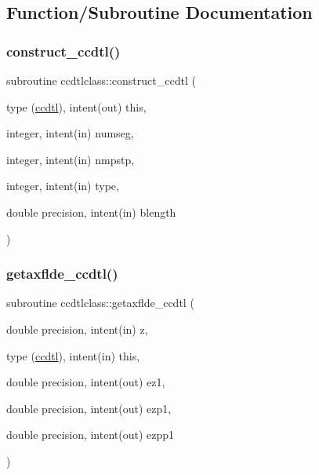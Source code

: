 \subsection{Function/\+Subroutine Documentation}
\mbox{\label{namespaceccdtlclass_aaa94d8179c6d59c2d3e81b64e8237962}} 
\subsubsection{\texorpdfstring{construct\_ccdtl()}{construct\_ccdtl()}}
{\footnotesize\ttfamily subroutine ccdtlclass\+::construct\+\_\+ccdtl (\begin{DoxyParamCaption}\item[{type (\mbox{\hyperlink{namespaceccdtlclass_structccdtlclass_1_1ccdtl}{ccdtl}}), intent(out)}]{this,  }\item[{integer, intent(in)}]{numseg,  }\item[{integer, intent(in)}]{nmpstp,  }\item[{integer, intent(in)}]{type,  }\item[{double precision, intent(in)}]{blength }\end{DoxyParamCaption})}

\mbox{\label{namespaceccdtlclass_adb7b1c30d3fcb087a5064911ccd4fd1d}} 
\subsubsection{\texorpdfstring{getaxflde\_ccdtl()}{getaxflde\_ccdtl()}}
{\footnotesize\ttfamily subroutine ccdtlclass\+::getaxflde\+\_\+ccdtl (\begin{DoxyParamCaption}\item[{double precision, intent(in)}]{z,  }\item[{type (\mbox{\hyperlink{namespaceccdtlclass_structccdtlclass_1_1ccdtl}{ccdtl}}), intent(in)}]{this,  }\item[{double precision, intent(out)}]{ez1,  }\item[{double precision, intent(out)}]{ezp1,  }\item[{double precision, intent(out)}]{ezpp1 }\end{DoxyParamCaption})}



